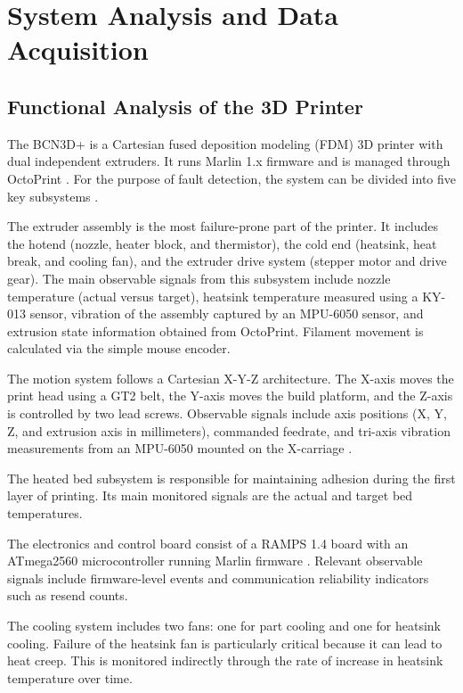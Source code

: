 \chapter{System Analysis and Data Acquisition}
\label{chap:chapter2}

\section{Functional Analysis of the 3D Printer}

The BCN3D+ is a Cartesian fused deposition modeling (FDM) 3D printer with dual independent extruders. It runs Marlin 1.x firmware and is managed through OctoPrint \cite{octoprint2024api}. For the purpose of fault detection, the system can be divided into five key subsystems \cite{blanchard2011systems}.

The extruder assembly is the most failure-prone part of the printer. It includes the hotend (nozzle, heater block, and thermistor), the cold end (heatsink, heat break, and cooling fan), and the extruder drive system (stepper motor and drive gear). The main observable signals from this subsystem include nozzle temperature (actual versus target), heatsink temperature measured using a KY-013 sensor, vibration of the assembly captured by an MPU-6050 sensor, and extrusion state information obtained from OctoPrint. Filament movement is calculated via the simple mouse encoder.

The motion system follows a Cartesian X-Y-Z architecture. The X-axis moves the print head using a GT2 belt, the Y-axis moves the build platform, and the Z-axis is controlled by two lead screws. Observable signals include axis positions (X, Y, Z, and extrusion axis in millimeters), commanded feedrate, and tri-axis vibration measurements from an MPU-6050 mounted on the X-carriage \cite{mpu6050_datasheet}.

The heated bed subsystem is responsible for maintaining adhesion during the first layer of printing. Its main monitored signals are the actual and target bed temperatures.

The electronics and control board consist of a RAMPS 1.4 board with an ATmega2560 microcontroller running Marlin firmware \cite{marlin2024thermal}. Relevant observable signals include firmware-level events and communication reliability indicators such as resend counts.

The cooling system includes two fans: one for part cooling and one for heatsink cooling. Failure of the heatsink fan is particularly critical because it can lead to heat creep. This is monitored indirectly through the rate of increase in heatsink temperature over time.

